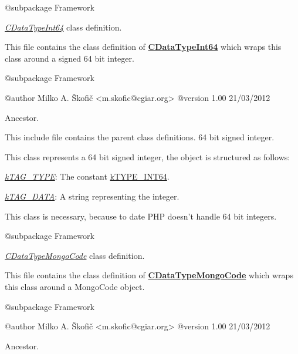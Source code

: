 \begin{DoxyVerb} @subpackage        Framework\end{DoxyVerb}


{\itshape \hyperlink{class_c_data_type_int64}{C\-Data\-Type\-Int64}} class definition.

This file contains the class definition of {\bfseries \hyperlink{class_c_data_type_int64}{C\-Data\-Type\-Int64}} which wraps this class around a signed 64 bit integer.

\begin{DoxyVerb} @subpackage        Framework

 @author            Milko A. Škofič <m.skofic@cgiar.org>
 @version   1.00 21/03/2012\end{DoxyVerb}


Ancestor.

This include file contains the parent class definitions. 64 bit signed integer.

This class represents a 64 bit signed integer, the object is structured as follows\-:


\begin{DoxyItemize}
\item {\itshape \hyperlink{}{k\-T\-A\-G\-\_\-\-T\-Y\-P\-E}}\-: The constant \hyperlink{}{k\-T\-Y\-P\-E\-\_\-\-I\-N\-T64}. 
\item {\itshape \hyperlink{}{k\-T\-A\-G\-\_\-\-D\-A\-T\-A}}\-: A string representing the integer. 
\end{DoxyItemize}

This class is necessary, because to date P\-H\-P doesn't handle 64 bit integers.

\begin{DoxyVerb} @subpackage        Framework\end{DoxyVerb}


{\itshape \hyperlink{class_c_data_type_mongo_code}{C\-Data\-Type\-Mongo\-Code}} class definition.

This file contains the class definition of {\bfseries \hyperlink{class_c_data_type_mongo_code}{C\-Data\-Type\-Mongo\-Code}} which wraps this class around a Mongo\-Code object.

\begin{DoxyVerb} @subpackage        Framework

 @author            Milko A. Škofič <m.skofic@cgiar.org>
 @version   1.00 21/03/2012\end{DoxyVerb}


Ancestor.

